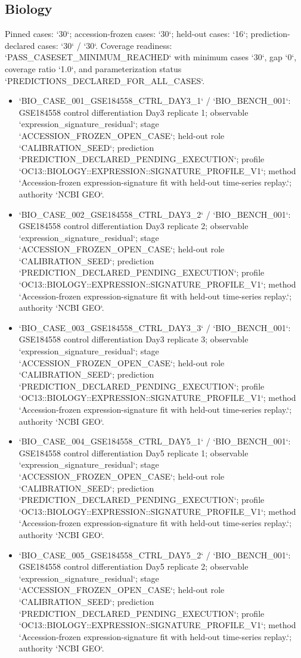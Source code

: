 \subsection{Biology}
Pinned cases: `30`; accession-frozen cases: `30`; held-out cases: `16`; prediction-declared cases: `30` / `30`.
Coverage readiness: `PASS\_CASESET\_MINIMUM\_REACHED` with minimum cases `30`, gap `0`, coverage ratio `1.0`, and parameterization status `PREDICTIONS\_DECLARED\_FOR\_ALL\_CASES`.
\begin{itemize}
\item `BIO\_CASE\_001\_GSE184558\_CTRL\_DAY3\_1` / `BIO\_BENCH\_001`: GSE184558 control differentiation Day3 replicate 1; observable `expression\_signature\_residual`; stage `ACCESSION\_FROZEN\_OPEN\_CASE`; held-out role `CALIBRATION\_SEED`; prediction `PREDICTION\_DECLARED\_PENDING\_EXECUTION`; profile `OC13::BIOLOGY::EXPRESSION::SIGNATURE\_PROFILE\_V1`; method `Accession-frozen expression-signature fit with held-out time-series replay.`; authority `NCBI GEO`.
\item `BIO\_CASE\_002\_GSE184558\_CTRL\_DAY3\_2` / `BIO\_BENCH\_001`: GSE184558 control differentiation Day3 replicate 2; observable `expression\_signature\_residual`; stage `ACCESSION\_FROZEN\_OPEN\_CASE`; held-out role `CALIBRATION\_SEED`; prediction `PREDICTION\_DECLARED\_PENDING\_EXECUTION`; profile `OC13::BIOLOGY::EXPRESSION::SIGNATURE\_PROFILE\_V1`; method `Accession-frozen expression-signature fit with held-out time-series replay.`; authority `NCBI GEO`.
\item `BIO\_CASE\_003\_GSE184558\_CTRL\_DAY3\_3` / `BIO\_BENCH\_001`: GSE184558 control differentiation Day3 replicate 3; observable `expression\_signature\_residual`; stage `ACCESSION\_FROZEN\_OPEN\_CASE`; held-out role `CALIBRATION\_SEED`; prediction `PREDICTION\_DECLARED\_PENDING\_EXECUTION`; profile `OC13::BIOLOGY::EXPRESSION::SIGNATURE\_PROFILE\_V1`; method `Accession-frozen expression-signature fit with held-out time-series replay.`; authority `NCBI GEO`.
\item `BIO\_CASE\_004\_GSE184558\_CTRL\_DAY5\_1` / `BIO\_BENCH\_001`: GSE184558 control differentiation Day5 replicate 1; observable `expression\_signature\_residual`; stage `ACCESSION\_FROZEN\_OPEN\_CASE`; held-out role `CALIBRATION\_SEED`; prediction `PREDICTION\_DECLARED\_PENDING\_EXECUTION`; profile `OC13::BIOLOGY::EXPRESSION::SIGNATURE\_PROFILE\_V1`; method `Accession-frozen expression-signature fit with held-out time-series replay.`; authority `NCBI GEO`.
\item `BIO\_CASE\_005\_GSE184558\_CTRL\_DAY5\_2` / `BIO\_BENCH\_001`: GSE184558 control differentiation Day5 replicate 2; observable `expression\_signature\_residual`; stage `ACCESSION\_FROZEN\_OPEN\_CASE`; held-out role `CALIBRATION\_SEED`; prediction `PREDICTION\_DECLARED\_PENDING\_EXECUTION`; profile `OC13::BIOLOGY::EXPRESSION::SIGNATURE\_PROFILE\_V1`; method `Accession-frozen expression-signature fit with held-out time-series replay.`; authority `NCBI GEO`.

\end{itemize}
